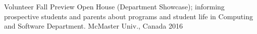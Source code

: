 

\begin{cvhonors}


  \cvhonor
    {Volunteer} %
    {Fall Preview Open House (Department Showcase); informing prospective students and parents about programs and student life in Computing and Software Department.} %
    {McMaster Univ., Canada} %
    {2016} %

\end{cvhonors}
